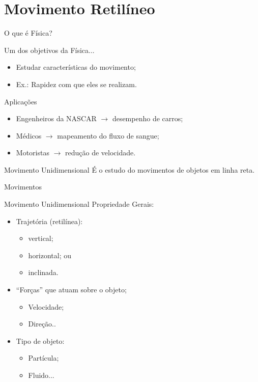 \documentclass[xcolor=dvipsnames,table]{beamer}
\begin{document}
	\section{Movimento Retilíneo}
	\begin{frame}{O que é Física?}
		\begin{block}{Um dos objetivos da Física...}
			\begin{itemize}
				\item Estudar características do movimento; \pause
				\item Ex.: Rapidez com que eles se realizam.
			\end{itemize}
		\end{block} \pause
		\begin{block}{Aplicações}
			\begin{itemize}
				\item Engenheiros da NASCAR $\rightarrow$ desempenho de carros; \pause
				\item Médicos $\rightarrow$ mapeamento do fluxo de sangue; \pause
				\item Motoristas $\rightarrow$ redução de velocidade.
			\end{itemize}
		\end{block} \pause
		\begin{block}{Movimento Unidimensional}
			É o estudo do movimentos de objetos em linha reta.
		\end{block}
	\end{frame}

	\begin{frame}{Movimentos}
		\begin{block}{Movimento Unidimensional}
			Propriedade Gerais:
			\begin{itemize}
				\item Trajetória (retilínea): \pause
					\begin{itemize}
						\item vertical;
						\item horizontal; ou 
						\item inclinada.
					\end{itemize} \pause
				\item ``Forças'' que atuam sobre o objeto; \pause
					\begin{itemize}
						\item Velocidade;
						\item Direção..
					\end{itemize}
				\item Tipo de objeto:
					\begin{itemize}
						\item Partícula;
						\item Fluido...
					\end{itemize}
			\end{itemize}
		\end{block}
	\end{frame}
\end{document}
